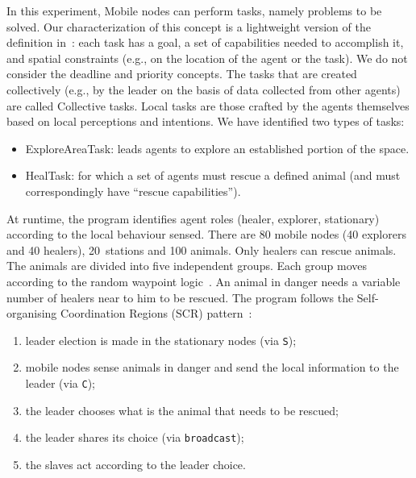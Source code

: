 \documentclass[jsan,article,accept,moreauthors,pdftex]{Definitions/mdpi}
\begin{document}
\begin{paracol}{2}
{In this experiment, {Mobile nodes} can perform {tasks}, namely problems to be solved.
 Our characterization of this concept is a lightweight version of the definition in~\cite{DBLP:conf/agents/FatimaW01}: 
 each task has a {goal}, a set of {capabilities} needed to accomplish it, 
 and {spatial constraints} (e.g., on the location of the agent or the task). We do not consider the deadline and priority concepts. %
 The tasks that are created collectively (e.g., by the leader on the basis of data collected from other agents) 
 are called {Collective tasks}. {Local tasks} are those crafted by the agents 
 themselves based on local perceptions and intentions.
 We have identified two types of tasks:
  \begin{itemize}
    \item {ExploreAreaTask}: leads agents to explore an established portion of the space.
    \item {HealTask}: for which a set of agents must rescue a defined animal (and must correspondingly have ``rescue capabilities''). 
  \end{itemize}
 }
%
At runtime, the program identifies agent roles ({healer}, {explorer}, {stationary})
 according to the local behaviour sensed.
%
There are 80 mobile nodes (40 explorers and 40 healers), \mbox{20 stations} and 100 animals. 
 Only healers can rescue animals.
%
The animals are divided into five independent groups.
 Each group moves according to the random waypoint logic~\cite{MAO2010201}.
%
An animal in danger needs a variable number
 of healers near to him to be rescued.
%
The program follows the {Self-organising Coordination Regions (SCR)} pattern~\cite{casadei2019scr}:
%
\begin{enumerate}
\item leader election is made in the stationary nodes (via \lstinline|S|);
\item mobile nodes sense animals in danger and send the local 
 information to the leader (via \lstinline|C|);
\item the leader chooses what is the animal that needs to be rescued;
\item the leader shares its choice (via \lstinline|broadcast|);
\item the slaves act according to the leader choice.
\end{enumerate}
%


\end{paracol}
\end{document}
